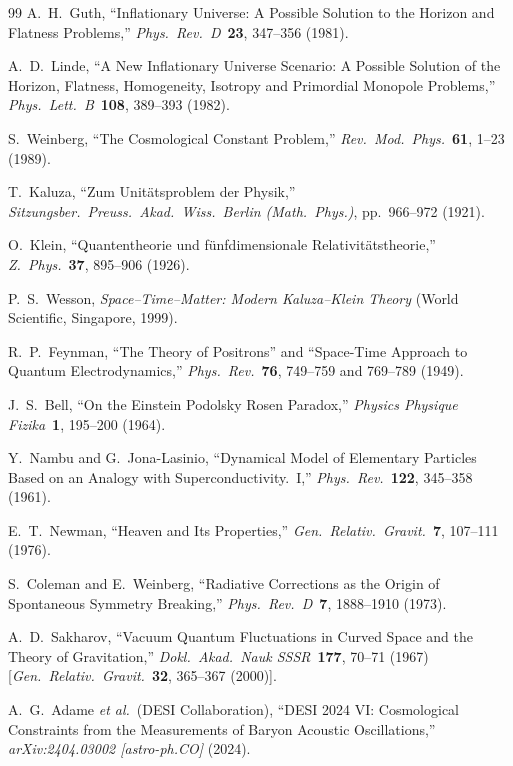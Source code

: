 \documentclass[11pt,a4paper]{article}
\begin{document}
\begin{thebibliography}{99}
A.~H.~Guth, ``Inflationary Universe: A Possible Solution to the Horizon and Flatness Problems,'' \emph{Phys.\ Rev.\ D}\ \textbf{23}, 347--356 (1981).

A.~D.~Linde, ``A New Inflationary Universe Scenario: A Possible Solution of the Horizon, Flatness, Homogeneity, Isotropy and Primordial Monopole Problems,'' \emph{Phys.\ Lett.\ B}\ \textbf{108}, 389--393 (1982).

S.~Weinberg, ``The Cosmological Constant Problem,'' \emph{Rev.\ Mod.\ Phys.}\ \textbf{61}, 1--23 (1989).

T.~Kaluza, ``Zum Unit\"atsproblem der Physik,'' \emph{Sitzungsber.\ Preuss.\ Akad.\ Wiss.\ Berlin (Math.\ Phys.)}, pp.\ 966--972 (1921).

O.~Klein, ``Quantentheorie und f\"unfdimensionale Relativit\"atstheorie,'' \emph{Z.\ Phys.}\ \textbf{37}, 895--906 (1926).

P.~S.~Wesson, \emph{Space--Time--Matter: Modern Kaluza--Klein Theory} (World Scientific, Singapore, 1999).

R.~P.~Feynman, ``The Theory of Positrons'' and ``Space-Time Approach to Quantum Electrodynamics,'' \emph{Phys.\ Rev.}\ \textbf{76}, 749--759 and 769--789 (1949).

J.~S.~Bell, ``On the Einstein Podolsky Rosen Paradox,'' \emph{Physics Physique Fizika}\ \textbf{1}, 195--200 (1964).

Y.~Nambu and G.~Jona-Lasinio, ``Dynamical Model of Elementary Particles Based on an Analogy with Superconductivity.\ I,'' \emph{Phys.\ Rev.}\ \textbf{122}, 345--358 (1961).

E.~T.~Newman, ``Heaven and Its Properties,'' \emph{Gen.\ Relativ.\ Gravit.}\ \textbf{7}, 107--111 (1976).

S.~Coleman and E.~Weinberg, ``Radiative Corrections as the Origin of Spontaneous Symmetry Breaking,'' \emph{Phys.\ Rev.\ D}\ \textbf{7}, 1888--1910 (1973).

A.~D.~Sakharov, ``Vacuum Quantum Fluctuations in Curved Space and the Theory of Gravitation,'' \emph{Dokl.\ Akad.\ Nauk SSSR}\ \textbf{177}, 70--71 (1967) [\emph{Gen.\ Relativ.\ Gravit.}\ \textbf{32}, 365--367 (2000)].

A.~G.~Adame \emph{et al.}\ (DESI Collaboration), ``DESI 2024 VI: Cosmological Constraints from the Measurements of Baryon Acoustic Oscillations,'' \emph{arXiv:2404.03002 [astro-ph.CO]} (2024).


\end{thebibliography}
\end{document}
